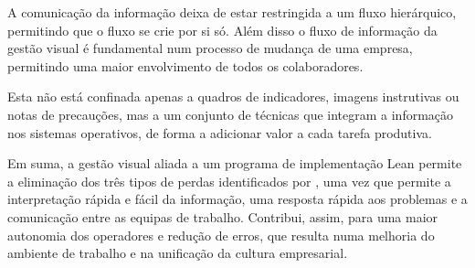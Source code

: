 A comunicação da informação deixa de estar restringida a um fluxo hierárquico, permitindo que o fluxo se crie por si só. Além disso o fluxo de informação da gestão visual é fundamental num processo de mudança de uma empresa, permitindo uma maior envolvimento de todos os colaboradores. 

Esta não está confinada apenas a quadros de indicadores, imagens instrutivas ou notas de precauções, mas a um conjunto de técnicas que integram a informação nos sistemas operativos, de forma a adicionar valor a cada tarefa produtiva. 

Em suma, a gestão visual aliada a um programa de implementação Lean permite a eliminação dos três tipos de perdas identificados por , uma vez que permite a interpretação rápida e fácil da informação, uma resposta rápida aos problemas e a comunicação entre as equipas de trabalho. Contribui, assim, para uma maior autonomia dos operadores e redução de erros, que resulta numa melhoria do ambiente de trabalho e na unificação da cultura empresarial.






 

